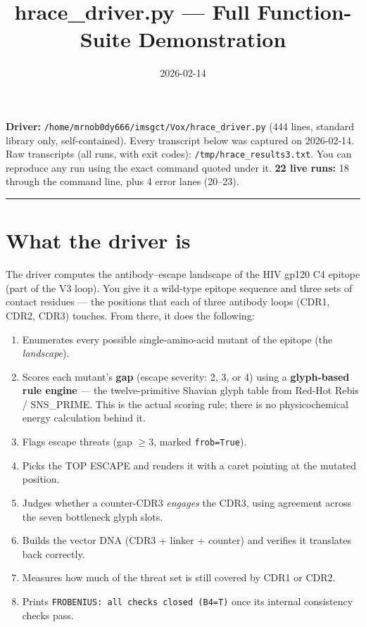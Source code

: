 \documentclass{article}
\title{hrace\_driver.py --- Full Function-Suite Demonstration}
\author{}
\date{2026-02-14}
\begin{document}
\maketitle

\textbf{Driver:} \texttt{/home/mrnob0dy666/imsgct/Vox/hrace\_driver.py}
(444 lines, standard library only, self-contained).
Every transcript below was captured on 2026-02-14. Raw transcripts (all runs,
with exit codes): \texttt{/tmp/hrace\_results3.txt}. You can reproduce any run
using the exact command quoted under it. \textbf{22 live runs:} 18 through the
command line, plus 4 error lanes (20--23).

\hrule
\section{What the driver is}

The driver computes the antibody--escape landscape of the HIV gp120 C4 epitope
(part of the V3 loop). You give it a wild-type epitope sequence and three sets
of contact residues --- the positions that each of three antibody loops
(CDR1, CDR2, CDR3) touches. From there, it does the following:

\begin{enumerate}
  \item Enumerates every possible single-amino-acid mutant of the epitope
        (the \emph{landscape}).
  \item Scores each mutant's \textbf{gap} (escape severity: 2, 3, or 4) using a
        \textbf{glyph-based rule engine} --- the twelve-primitive Shavian glyph
        table from Red-Hot Rebis / SNS\_PRIME. This is the actual scoring rule;
        there is no physicochemical energy calculation behind it.
  \item Flags escape threats (gap \(\geq 3\), marked \texttt{frob=True}).
  \item Picks the TOP ESCAPE and renders it with a caret pointing at the
        mutated position.
  \item Judges whether a counter-CDR3 \emph{engages} the CDR3, using agreement
        across the seven bottleneck glyph slots.
  \item Builds the vector DNA (CDR3 + linker + counter) and verifies it
        translates back correctly.
  \item Measures how much of the threat set is still covered by CDR1 or CDR2.
  \item Prints \texttt{FROBENIUS: all checks closed (B4=T)} once its internal
        consistency checks pass.
\end{enumerate}
\end{document}
